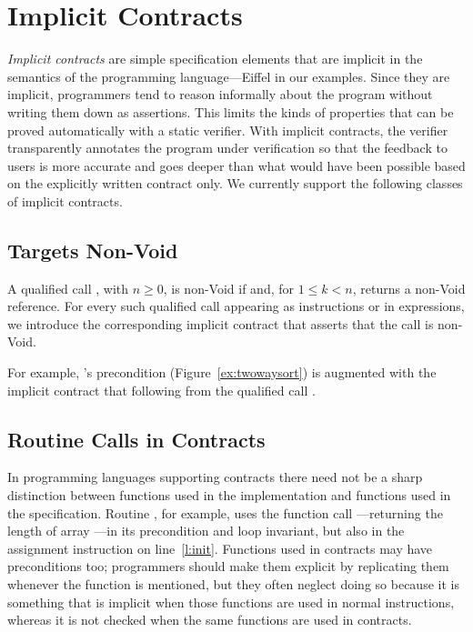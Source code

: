 \section{Implicit Contracts}
\label{sec:m-implicit}


\emph{Implicit contracts} are simple specification elements that are implicit in the semantics of the programming language---Eiffel in our examples.
Since they are implicit, programmers tend to reason informally about the program without writing them down as assertions.
This limits the kinds of properties that can be proved automatically with a static verifier.
With implicit contracts, the verifier transparently annotates the program under verification so that the feedback to users is more accurate and goes deeper than what would have been possible based on the explicitly written contract only.
We currently support the following classes of implicit contracts.


\subsection{Targets Non-Void}

A qualified call , with $n \geq 0$, is non-Void if  and, for $1 \leq k < n$,  returns a non-Void reference.
For every such qualified call appearing as instructions or in expressions, we introduce the corresponding implicit contract that asserts that the call is non-Void.

For example, 's precondition (Figure~\ref{ex:twowaysort}) is augmented with the implicit contract that  following from the qualified call .

\subsection{Routine Calls in Contracts}

In programming languages supporting contracts there need not be a sharp distinction between functions used in the implementation and functions used in the specification.
Routine , for example, uses the function call ---returning the length of array ---in its precondition and loop invariant, but also in the assignment instruction on line~\ref{l:init}.
Functions used in contracts may have preconditions too; programmers should make them explicit by replicating them whenever the function is mentioned, but they often neglect doing so because it is something that is implicit when those functions are used in normal instructions, whereas it is not checked when the same functions are used in contracts.

